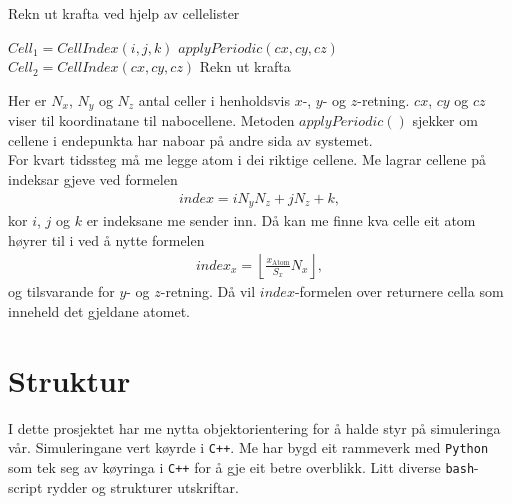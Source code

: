 \documentclass[12pt, a4paper]{article}
\theoremstyle{definition}
\begin{document}
        \begin{algorithm}[H]
            \caption{Rekn ut krafta ved hjelp av cellelister}
            \label{Cellelister}
            \begin{algorithmic}[1]
                            \State $Cell_{1} = CellIndex(i, j, k)$
                                        \State $applyPeriodic(cx, cy, cz)$
                                        \State $Cell_{2} = CellIndex(cx, cy, cz)$
                                                \State Rekn ut krafta
                                            \EndFor
                                        \EndFor
                                    \EndFor
                                \EndFor
                            \EndFor
                        \EndFor
                    \EndFor
                \EndFor
            \end{algorithmic}
        \end{algorithm}
        Her er $N_x$, $N_y$ og $N_z$ antal celler i henholdsvis $x$-, $y$- og $z$-retning. $cx$, $cy$ og $cz$ viser til koordinatane til nabocellene. Metoden $applyPeriodic()$ 
        sjekker om cellene i endepunkta har naboar på andre sida av systemet. \\
        For kvart tidssteg må me legge atom i dei riktige cellene. Me lagrar cellene på indeksar gjeve ved formelen
        \begin{align*}
            index = iN_yN_z + jN_z + k,
        \end{align*}
        kor $i$, $j$ og $k$ er indeksane me sender inn. Då kan me finne kva celle eit atom høyrer til i ved å nytte formelen
        \begin{align*}
            index_x = \left \lfloor \frac{x_{\text{Atom}}}{S_{x}} N_{x}\right \rfloor,
        \end{align*}
        og tilsvarande for $y$- og $z$-retning. Då vil $index$-formelen over returnere cella som inneheld det gjeldane atomet.

\newpage
\section*{Struktur}
    I dette prosjektet har me nytta objektorientering for å halde styr på simuleringa vår. Simuleringane vert køyrde i \verb!C++!. Me har bygd eit rammeverk med 
    \verb!Python! som tek seg av køyringa i \verb!C++! for å gje eit betre overblikk. Litt diverse \verb!bash!-script rydder og strukturer utskriftar.
\end{document}
